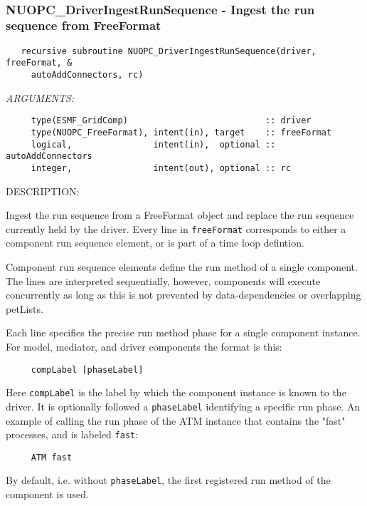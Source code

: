 \mbox{}\hrulefill\ 
 
\subsubsection [NUOPC\_DriverIngestRunSequence] {NUOPC\_DriverIngestRunSequence - Ingest the run sequence from FreeFormat}


  
\begin{verbatim}   recursive subroutine NUOPC_DriverIngestRunSequence(driver, freeFormat, &
     autoAddConnectors, rc)\end{verbatim}{\em ARGUMENTS:}
\begin{verbatim}     type(ESMF_GridComp)                           :: driver
     type(NUOPC_FreeFormat), intent(in), target    :: freeFormat
     logical,                intent(in),  optional :: autoAddConnectors
     integer,                intent(out), optional :: rc \end{verbatim}
{\sf DESCRIPTION:\\ }


   Ingest the run sequence from a FreeFormat object and replace the 
   run sequence currently held by the driver. Every line in 
   {\tt freeFormat} corresponds to either a component run sequence element, or 
   is part of a time loop defintion.
  
   Component run sequence elements define the run method of a single component.
   The lines are interpreted sequentially, however, components will execute 
   concurrently as long as this is not prevented by data-dependencies or
   overlapping petLists.
  
   Each line specifies the precise run method phase for a single component 
   instance. For model, mediator, and driver components the format is this:
  
   \begin{verbatim}
     compLabel [phaseLabel]
   \end{verbatim}
   Here {\tt compLabel} is the label by which the component instance is known to
   the driver. It is optionally followed a {\tt phaseLabel} identifying a
   specific run phase. An example of calling the run phase of the ATM instance 
   that contains the "fast" processes, and is labeled {\tt fast}:
  
   \begin{verbatim}
     ATM fast
   \end{verbatim}
   By default, i.e. without {\tt phaseLabel}, the first
   registered run method of the component is used.
  
